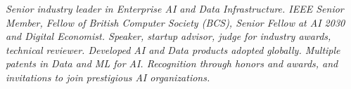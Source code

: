 {\selectfont
	\begin{justify}\textit{Senior industry leader in Enterprise AI and Data Infrastructure. IEEE Senior Member, Fellow of British Computer Society (BCS), Senior Fellow at AI 2030 and Digital Economist. Speaker, startup advisor, judge for industry awards, technical reviewer. Developed AI and Data products adopted globally. Multiple patents in Data and ML for AI. Recognition through honors and awards, and invitations to join prestigious AI organizations.}\end{justify}
}